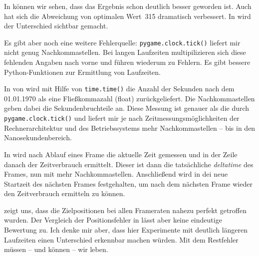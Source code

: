 
In   können wir sehen, dass das Ergebnis schon deutlich besser geworden ist. Auch hat sich die Abweichung von optimalen Wert~315 dramatisch verbessert. In  wird der Unterschied sichtbar gemacht.


Es gibt aber noch eine weitere Fehlerquelle: \texttt{pygame.clock.tick()} liefert mir nicht genug Nachkommastellen. Bei langen Laufzeiten multipilizieren sich diese fehlenden Angaben nach vorne und führen wiederum zu Fehlern. Es gibt bessere Python-Funktionen zur Ermittlung von Laufzeiten.

In  von  wird mit Hilfe von \texttt{time.time()} die Anzahl der Sekunden nach dem 01.01.1970 als eine Fließkommazahl (float) zurückgeliefert. Die Nachkommastellen geben dabei die Sekundenbruchteile an. Diese Messung ist genauer als die durch \texttt{pygame.clock.tick()} und liefert mir je nach Zeitmessungsmöglichkeiten der Rechnerarchitektur und des Betriebssystems mehr Nachkommastellen -- bis in den Nanosekundenbereich.

In  wird nach Ablauf eines Frame die aktuelle Zeit gemessen und in der Zeile danach der Zeitverbrauch ermittelt. Dieser ist dann die tatsächliche \emph{deltatime} des Frames, nun mit mehr Nachkommastellen. Anschließend wird in  dei neue Startzeit des nächsten Frames festgehalten, um nach dem nächsten Frame wieder den Zeitverbrauch ermitteln zu können.

 zeigt uns, dass die Zielpositionen bei allen Frameraten nahezu perfekt getroffen wurden. Der Vergleich der Positionsfehler in  lässt aber keine eindeutige Bewertung zu. Ich denke mir aber, dass hier Experimente mit deutlich längeren Laufzeiten einen Unterschied erkennbar machen würden. Mit dem Restfehler müssen -- und können -- wir leben.


